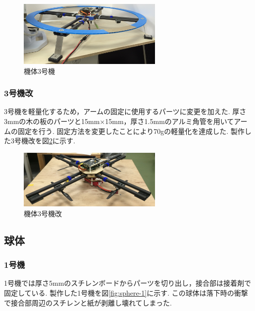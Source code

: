 \documentclass[12pt,oneside]{sotsuken_paper}
\begin{document}
\begin{figure}[htbp]
	\begin{center}
		\includegraphics[width=70mm]{image/drone/drone-3-1.jpg}
		\caption{機体3号機}
		\label{fig:drone-3-1}
	\end{center}
\end{figure}

\subsubsection{3号機改}
3号機を軽量化するため，アームの固定に使用するパーツに変更を加えた.
厚さ3mmの木の板のパーツと15mm×15mm，厚さ1.5mmのアルミ角管を用いてアームの固定を行う.
固定方法を変更したことにより70gの軽量化を達成した.
製作した3号機改を図\ref{fig:drone-3-2}に示す.

\begin{figure}[htbp]
	\begin{center}
		\includegraphics[width=70mm]{image/drone/drone-3-2.jpg}
		\caption{機体3号機改}
		\label{fig:drone-3-2}
	\end{center}
\end{figure}

\subsection{球体}

\subsubsection{1号機}
1号機では厚さ5mmのスチレンボードからパーツを切り出し，接合部は接着剤で固定している.
製作した1号機を図\ref{fig:sphere-1}に示す.
この球体は落下時の衝撃で接合部周辺のスチレンと紙が剥離し壊れてしまった.
\end{document}
